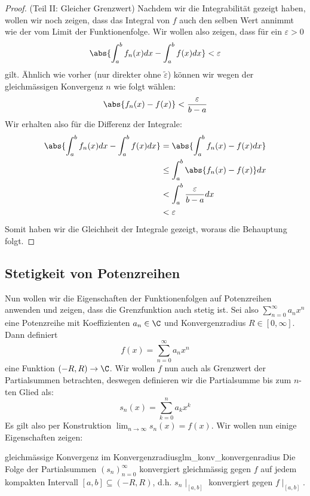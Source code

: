 \begin{proof}
(Teil II: Gleicher Grenzwert) Nachdem wir die Integrabilität gezeigt haben, wollen wir noch zeigen, dass das Integral von $f$ auch den selben Wert annimmt wie der vom Limit der Funktionenfolge. Wir wollen also zeigen, dass für ein $\varepsilon>0$
$$\abs{\int_a^b f_n(x) dx - \int_a^b f(x) dx} < \varepsilon$$
gilt. Ähnlich wie vorher (nur direkter ohne $\tilde{\varepsilon}$) können wir wegen der gleichmässigen Konvergenz $n$ wie folgt wählen:
$$\abs{f_n(x) - f(x)}<\frac{\varepsilon}{b-a}$$
Wir erhalten also für die Differenz der Integrale:
\begin{align*}
    \abs{\int_a^b f_n(x) dx - \int_a^b f(x) dx} &= \abs{\int_a^b f_n(x) - f(x) dx}\\
    &\leq \int_a^b \abs{f_n(x)- f(x)} dx\\
    &<\int_a^b \frac{\varepsilon}{b-a}dx\\
    &< \varepsilon
\end{align*}
Somit haben wir die Gleichheit der Integrale gezeigt, woraus die Behauptung folgt.
\end{proof}

\subsection{Stetigkeit von Potenzreihen}
Nun wollen wir die Eigenschaften der Funktionenfolgen auf Potenzreihen anwenden und zeigen, dass die Grenzfunktion auch stetig ist. Sei also $\sum_{n=0}^\infty a_n x^n$ eine Potenzreihe mit Koeffizienten $a_n \in \C$ und Konvergenzradius $R \in [0, \infty]$. Dann definiert $$f(x) = \sum_{n=0}^\infty a_n x^n$$
eine Funktion $(-R, R) \to \C$. Wir wollen $f$ nun auch als Grenzwert der Partialsummen betrachten, deswegen definieren wir die Partialsumme bis zum $n$-ten Glied als:
$$s_n(x) = \sum_{k=0}^n a_k x^k$$
Es gilt also per Konstruktion $\lim_{n \to \infty} s_n(x) = f(x)$. Wir wollen nun einige Eigenschaften zeigen:

\begin{lemma}{gleichmässige Konvergenz im Konvergenzradius}{glm_konv_konvergenradius}
Die Folge der Partialsummen $(s_n)_{n = 0}^\infty$ konvergiert gleichmässig gegen $f$ auf jedem kompakten Intervall $[a, b] \subseteq (-R,R) $, d.h. $s_n\mid_{[a,b]}$ konvergiert gegen $f\mid_{[a,b]}$.
\end{lemma}

